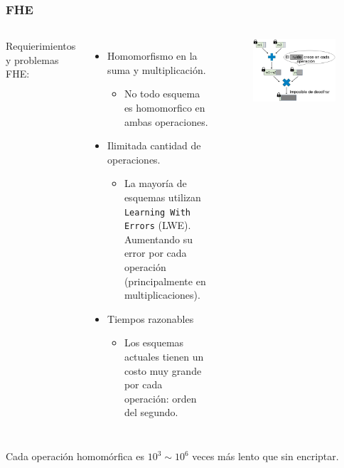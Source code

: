 \documentclass[10pt]{beamer}
\begin{document}







\begin{frame}
\frametitle{FHE}
\begin{columns}
    Requierimientos y problemas FHE:
\pause
\begin{itemize}
  \item[\textcolor{frenchblue}{\textbullet}] Homomorfismo en la suma y multiplicación.
    \begin{itemize}
\pause
      \item[\textcolor{red}{\textbullet}]  No todo esquema es homomorfico en ambas operaciones.
    \end{itemize}
\pause
  \item[\textcolor{frenchblue}{\textbullet}] Ilimitada cantidad de operaciones.
    \begin{itemize}
\pause
      \item[\textcolor{red}{\textbullet}]  La mayoría de esquemas utilizan \texttt{Learning With Errors} (LWE). Aumentando su error por cada operación (principalmente en multiplicaciones).
    \end{itemize}
\pause
  \item[\textcolor{frenchblue}{\textbullet}] Tiempos razonables
    \begin{itemize}
\pause
      \item[\textcolor{red}{\textbullet}]  Los esquemas actuales tienen un costo muy grande por cada operación: orden del segundo.
    \end{itemize}
\end{itemize}
\pause
        \begin{figure}[h!]
            \centering
            \includegraphics[scale=0.2]{multNoise.jpg}
        \end{figure}

\end{columns}
\pause
        Cada operación homomórfica es $10^3 \sim 10^6$ veces más lento que sin  encriptar.


\end{frame}
\end{document}
